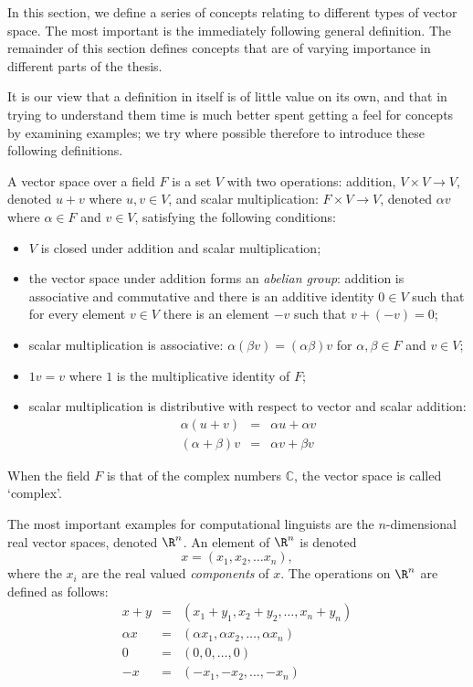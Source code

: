 In this section, we define a series of concepts relating to different types of vector space. The most important is the immediately following general definition. The remainder of this section defines concepts that are of varying importance in different parts of the thesis.

It is our view that a definition in itself is of little value on its own, and that in trying to understand them time is much better spent getting a feel for concepts by examining examples; we try where possible therefore to introduce these following definitions.

\begin{defn}
A vector space over a field $F$ is a set $V$ with two operations: addition, $V \times V \rightarrow V$, denoted $u + v$ where $u,v \in V$, and scalar multiplication: $F \times V \rightarrow V$, denoted $\alpha v$ where $\alpha \in F$ and $v \in V$,
satisfying the following conditions:
\begin{itemize}
\item $V$ is closed under addition and scalar multiplication;
\item the vector space under addition forms an \emph{abelian group}: addition is associative and commutative and there is an additive identity $0 \in V$ such that for every element $v \in V$ there is an element $-v$ such that $v + (-v) = 0$;
\item scalar multiplication is associative: $\alpha (\beta v) = (\alpha \beta) v$ for $\alpha, \beta \in F$ and $v \in V$;
\item $1v = v$ where $1$ is the multiplicative identity of $F$;
\item scalar multiplication is distributive with respect to vector and scalar addition:
\begin{eqnarray*}
\alpha(u + v) & = & \alpha u + \alpha v\\
(\alpha + \beta)v & = & \alpha v + \beta v
\end{eqnarray*}
\end{itemize}
When the field $F$ is that of the complex numbers $\mathbb{C}$, the vector space is called `complex'.
\end{defn}

\begin{example}
The most important examples for computational linguists are the $n$-dimensional real vector spaces, denoted $\R^n$. An element of $\R^n$ is denoted
$$x = (x_1,x_2,\ldots x_n),$$
where the $x_i$ are the real valued \emph{components} of $x$. The operations on $\R^n$ are defined as follows:
\begin{eqnarray*}
x + y & = & (x_1 + y_1, x_2 + y_2, \ldots, x_n + y_n)\\
\alpha x & = & (\alpha x_1, \alpha x_2, \ldots, \alpha x_n)\\
0 & = & (0,0,\ldots, 0)\\
-x & = & (-x_1, -x_2, \ldots, -x_n)
\end{eqnarray*}
\end{example}

